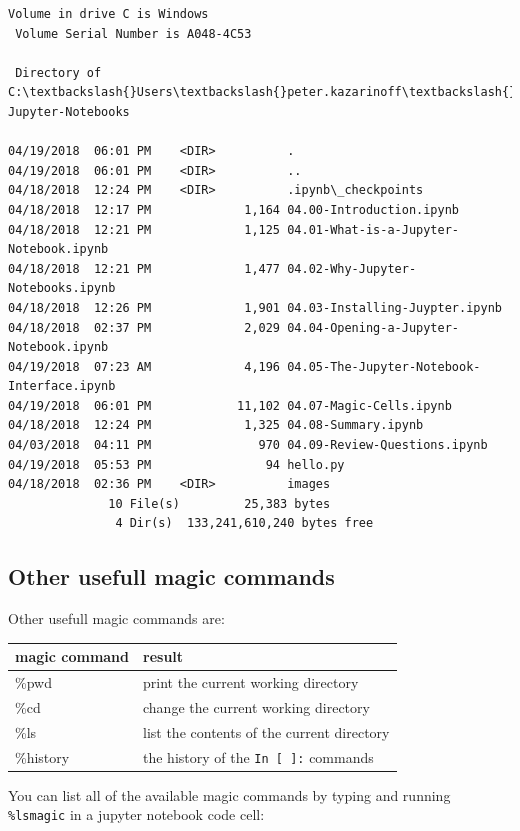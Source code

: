 \documentclass{book}
\begin{document}
    \begin{Verbatim}[commandchars=\\\{\}]
 Volume in drive C is Windows
 Volume Serial Number is A048-4C53

 Directory of C:\textbackslash{}Users\textbackslash{}peter.kazarinoff\textbackslash{}Documents\textbackslash{}book\textbackslash{}notebooks\textbackslash{}04-Jupyter-Notebooks

04/19/2018  06:01 PM    <DIR>          .
04/19/2018  06:01 PM    <DIR>          ..
04/18/2018  12:24 PM    <DIR>          .ipynb\_checkpoints
04/18/2018  12:17 PM             1,164 04.00-Introduction.ipynb
04/18/2018  12:21 PM             1,125 04.01-What-is-a-Jupyter-Notebook.ipynb
04/18/2018  12:21 PM             1,477 04.02-Why-Jupyter-Notebooks.ipynb
04/18/2018  12:26 PM             1,901 04.03-Installing-Juypter.ipynb
04/18/2018  02:37 PM             2,029 04.04-Opening-a-Jupyter-Notebook.ipynb
04/19/2018  07:23 AM             4,196 04.05-The-Jupyter-Notebook-Interface.ipynb
04/19/2018  06:01 PM            11,102 04.07-Magic-Cells.ipynb
04/18/2018  12:24 PM             1,325 04.08-Summary.ipynb
04/03/2018  04:11 PM               970 04.09-Review-Questions.ipynb
04/19/2018  05:53 PM                94 hello.py
04/18/2018  02:36 PM    <DIR>          images
              10 File(s)         25,383 bytes
               4 Dir(s)  133,241,610,240 bytes free

    \end{Verbatim}


    
        \subsection{Other usefull magic
commands}\label{other-usefull-magic-commands}
    




    
        Other usefull magic commands are:

\begin{longtable}[]{@{}ll@{}}
\toprule
magic command & result\tabularnewline
\midrule
\endhead
\%pwd & print the current working directory\tabularnewline
\%cd & change the current working directory\tabularnewline
\%ls & list the contents of the current directory\tabularnewline
\%history & the history of the \lstinline!In [ ]:!
commands\tabularnewline
\bottomrule
\end{longtable}

You can list all of the available magic commands by typing and running
\lstinline!%lsmagic! in a jupyter notebook code cell:
    
\end{document}
